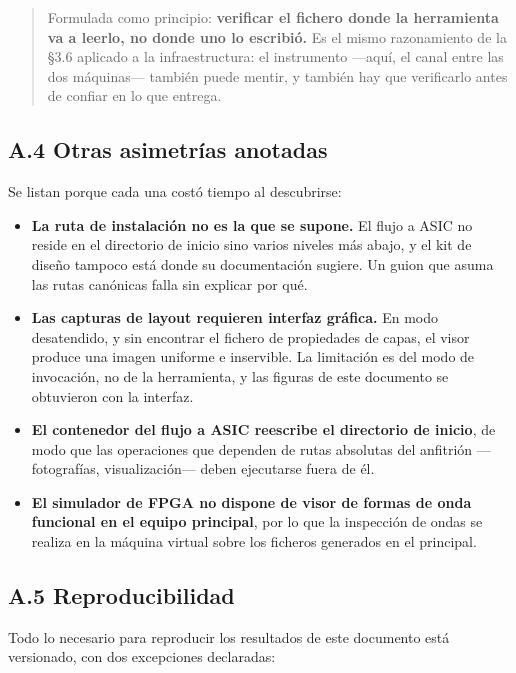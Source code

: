 \begin{quote}
Formulada como principio: \textbf{verificar el fichero donde la
herramienta va a leerlo, no donde uno lo escribió.} Es el mismo
razonamiento de la §3.6 aplicado a la infraestructura: el instrumento
---aquí, el canal entre las dos máquinas--- también puede mentir, y
también hay que verificarlo antes de confiar en lo que entrega.
\end{quote}

\subsection{A.4 Otras asimetrías
anotadas}\label{a.4-otras-asimetruxedas-anotadas}

Se listan porque cada una costó tiempo al descubrirse:

\begin{itemize}
\tightlist
\item
  \textbf{La ruta de instalación no es la que se supone.} El flujo a
  ASIC no reside en el directorio de inicio sino varios niveles más
  abajo, y el kit de diseño tampoco está donde su documentación sugiere.
  Un guion que asuma las rutas canónicas falla sin explicar por qué.
\item
  \textbf{Las capturas de layout requieren interfaz gráfica.} En modo
  desatendido, y sin encontrar el fichero de propiedades de capas, el
  visor produce una imagen uniforme e inservible. La limitación es del
  modo de invocación, no de la herramienta, y las figuras de este
  documento se obtuvieron con la interfaz.
\item
  \textbf{El contenedor del flujo a ASIC reescribe el directorio de
  inicio}, de modo que las operaciones que dependen de rutas absolutas
  del anfitrión ---fotografías, visualización--- deben ejecutarse fuera
  de él.
\item
  \textbf{El simulador de FPGA no dispone de visor de formas de onda
  funcional en el equipo principal}, por lo que la inspección de ondas
  se realiza en la máquina virtual sobre los ficheros generados en el
  principal.
\end{itemize}

\subsection{A.5 Reproducibilidad}\label{a.5-reproducibilidad}

Todo lo necesario para reproducir los resultados de este documento está
versionado, con dos excepciones declaradas:

